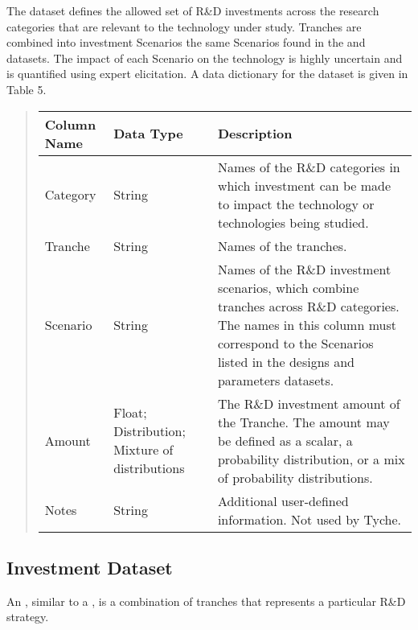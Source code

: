 \documentclass[letterpaper,10pt,english]{sphinxmanual}
\begin{document}
The  dataset defines the allowed set of R\&D investments across the research categories that are relevant to the technology under study. Tranches are combined into investment Scenarios \textendash{} the same Scenarios found in the  and  datasets. The impact of each Scenario on the technology is highly uncertain and is quantified using expert elicitation. A data dictionary for the  dataset is given in Table 5.

\begin{quote}


\begin{savenotes}\sphinxattablestart
\centering
\begin{tabulary}{\linewidth}[t]{|T|T|T|}
\hline
\sphinxstyletheadfamily 
Column Name
&\sphinxstyletheadfamily 
Data Type
&\sphinxstyletheadfamily 
Description
\\
\hline
Category
&
String
&
Names of the R\&D categories in which investment can be made to impact the technology or technologies being studied.
\\
\hline
Tranche
&
String
&
Names of the tranches.
\\
\hline
Scenario
&
String
&
Names of the R\&D investment scenarios, which combine tranches across R\&D categories. The names in this column must correspond to the Scenarios listed in the designs and parameters datasets.
\\
\hline
Amount
&
Float; Distribution; Mixture of distributions
&
The R\&D investment amount of the Tranche. The amount may be defined as a scalar, a probability distribution, or a mix of probability distributions.
\\
\hline
Notes
&
String
&
Additional user-defined information. Not used by Tyche.
\\
\hline
\end{tabulary}
\par
\sphinxattableend\end{savenotes}
\end{quote}


\subsection{Investment Dataset}
\label{\detokenize{cheat-sheet:investment-dataset}}
An , similar to a , is a combination of tranches that represents a particular R\&D strategy.
\end{document}
